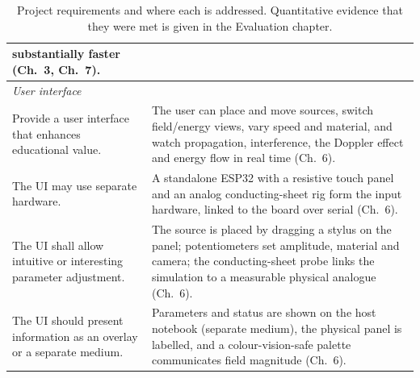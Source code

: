 \documentclass[11pt]{report}
\begin{document}
\begin{table}[h]
\begin{tabular}{|p{}|p{}|}
substantially faster (Ch.~3, Ch.~7). \\
\hline
\multicolumn{2}{|l|}{\textit{User interface}}\\
\hline
Provide a user interface that enhances educational value. &
The user can place and move sources, switch field/energy views, vary speed and
material, and watch propagation, interference, the Doppler effect and energy flow
in real time (Ch.~6). \\
\hline
The UI may use separate hardware. &
A standalone ESP32 with a resistive touch panel and an analog conducting-sheet
rig form the input hardware, linked to the board over serial (Ch.~6). \\
\hline
The UI shall allow intuitive or interesting parameter adjustment. &
The source is placed by dragging a stylus on the panel; potentiometers set
amplitude, material and camera; the conducting-sheet probe links the simulation
to a measurable physical analogue (Ch.~6). \\
\hline
The UI should present information as an overlay or a separate medium. &
Parameters and status are shown on the host notebook (separate medium), the
physical panel is labelled, and a colour-vision-safe palette communicates field
magnitude (Ch.~6). \\
\hline
\end{tabular}
\caption{Project requirements and where each is addressed. Quantitative evidence
that they were met is given in the Evaluation chapter.}
\label{tab:reqs}
\end{table}
\end{document}
